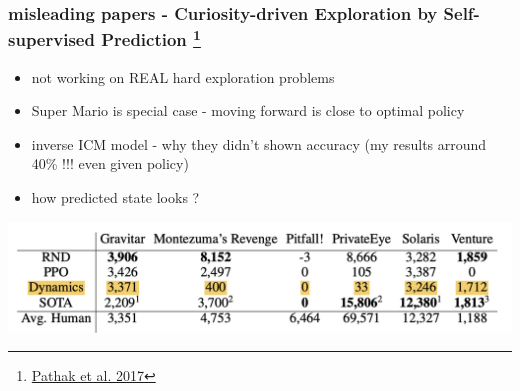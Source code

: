 \documentclass{beamer}
\begin{document}
\begin{frame}
  
  \frametitle{misleading papers - Curiosity-driven Exploration by Self-supervised Prediction \footnote{\href{https://arxiv.org/abs/1705.05363}{Pathak et al. 2017}}}
  
  \begin{itemize}
    \item not working on REAL hard exploration problems
    \item Super Mario is special case - moving forward is close to optimal policy
    \item inverse ICM model - why they didn't shown accuracy (my results arround 40\% !!! even given policy)
    \item how predicted state looks ?
  \end{itemize}

  \centering
  \includegraphics[scale=0.25]{../papers_captions/icm_a.png}

\end{frame}
\end{document}
